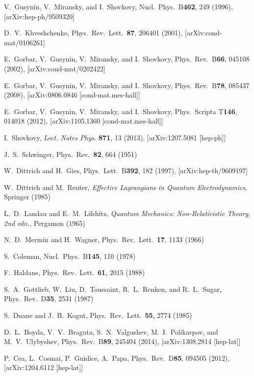 \documentclass[aps,prd,twocolumn,showpacs,superscriptaddress,groupedaddress]{revtex4}  %
\begin{document}
\begin{thebibliography}{99}
V.~Gusynin, V.~Miransky, and I.~Shovkovy, Nucl.\ Phys.\ B{\bf 462}, 249 (1996), [arXiv:hep-ph/9509320]

D.~V.~Khveshchenko, Phys.\ Rev.\ Lett.\ {\bf 87}, 206401 (2001), [arXiv:cond-mat/0106261]

E.~Gorbar, V.~Gusynin, V.~Miransky, and I.~Shovkovy, Phys.\ Rev.\ B{\bf 66}, 045108 (2002), [arXiv:cond-mat/0202422]

E.~Gorbar, V.~Gusynin, V.~Miransky, and I.~Shovkovy, Phys.\ Rev.\ B{\bf 78}, 085437 (2008), [arXiv:0806.0846 [cond-mat.mes-hall]]

E.~Gorbar, V.~Gusynin, V.~Miransky, and I.~Shovkovy, Phys.\ Scripta T{\bf 146}, 014018 (2012), [arXiv:1105.1360 [cond-mat.mes-hall]]

I.~Shovkovy, {\it Lect. Notes Phys.} {\bf 871}, 13 (2013), [arXiv:1207.5081 [hep-ph]]

J.~S.~Schwinger, Phys.\ Rev.\ {\bf 82}, 664 (1951)

W.~Dittrich and H.~Gies, Phys.\ Lett.\ B{\bf 392}, 182 (1997), [arXiv:hep-th/9609197]

W.~Dittrich and M.~Reuter, {\it Effective Lagrangians in Quantum Electrodynamics}, Springer (1985)

L.~D.~Landau and E.~M.~Lifshitz, {\it Quantum Mechanics: Non-Relativistic Theory, 2nd edn.}, Pergamon (1965)

N.~D.~Mermin and H.~Wagner, Phys.\ Rev.\ Lett.\ {\bf 17}, 1133 (1966)

S.~Coleman, Nucl.\ Phys.\ B{\bf 145}, 110 (1978)

F.~Haldane, Phys.\ Rev.\ Lett.\ {\bf  61}, 2015 (1988)

S.~A.~Gottlieb, W.~Liu, D.~Toussaint, R.~L.~Renken, and R.~L.~Sugar, Phys.\ Rev.\ D{\bf 35}, 2531 (1987)

S.~Duane and J.~B.~Kogut, Phys.\ Rev.\ Lett.\ {\bf 55}, 2774 (1985)

D.~L.~Boyda, V.~V.~Braguta, S.~N.~Valgushev, M.~I.~Polikarpov, and M.~V.~Ulybyshev, Phys.\ Rev.\ B{\bf 89}, 245404 (2014), [arXiv:1308.2814 [hep-lat]]

P.~Cea, L.~Cosmai, P.~Guidice, A.~Papa, Phys.\ Rev.\ D{\bf85}, 094505 (2012), [arXiv:1204.6112 [hep-lat]]


\end{thebibliography}
\end{document}
